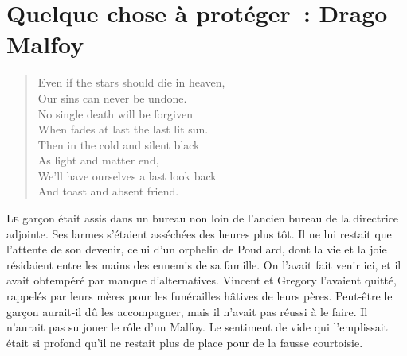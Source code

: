 \chapter[Quelque chose à protéger~: Drago Malfoy]{Quelque chose à protéger~: Drago Malfoy\protect\footnotemark}
    \begin{verse}
      Even if the stars should die in heaven, \\
      Our sins can never be undone. \\
      No single death will be forgiven \\
      When fades at last the last lit sun. \\
      Then in the cold and silent black \\
      As light and matter end, \\
      We’ll have ourselves a last look back \\
      And toast and absent friend. \\
    \end{verse}

\lettrine{L}{e} garçon était assis dans un bureau non loin de l'ancien bureau de la directrice adjointe. Ses larmes s'étaient asséchées des heures plus tôt. Il ne lui restait que l'attente de son devenir, celui d'un orphelin de Poudlard, dont la vie et la joie résidaient entre les mains des ennemis de sa famille. On l'avait fait venir ici, et il avait obtempéré par manque d'alternatives. Vincent et Gregory l'avaient quitté, rappelés par leurs mères pour les funérailles hâtives de leurs pères. Peut-être le garçon aurait-il dû les accompagner, mais il n'avait pas réussi à le faire. Il n'aurait pas su jouer le rôle d'un Malfoy. Le sentiment de vide qui l'emplissait était si profond qu'il ne restait plus de place pour de la fausse courtoisie.

